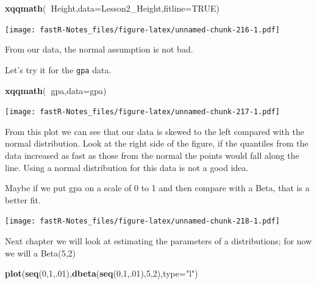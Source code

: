 \documentclass[]{book}
\newenvironment{Shaded}{\begin{snugshade}}{\end{snugshade}}
\newcommand{\KeywordTok}[1]{\textcolor[rgb]{0.13,0.29,0.53}{\textbf{#1}}}
\newcommand{\DataTypeTok}[1]{\textcolor[rgb]{0.13,0.29,0.53}{#1}}
\newcommand{\DecValTok}[1]{\textcolor[rgb]{0.00,0.00,0.81}{#1}}
\newcommand{\StringTok}[1]{\textcolor[rgb]{0.31,0.60,0.02}{#1}}
\newcommand{\OtherTok}[1]{\textcolor[rgb]{0.56,0.35,0.01}{#1}}
\newcommand{\OperatorTok}[1]{\textcolor[rgb]{0.81,0.36,0.00}{\textbf{#1}}}
\newcommand{\NormalTok}[1]{#1}
\theoremstyle{definition}
\theoremstyle{definition}
\theoremstyle{definition}
\theoremstyle{remark}
\begin{document}
\begin{Shaded}
\begin{Highlighting}[]
\KeywordTok{xqqmath}\NormalTok{(}\OperatorTok{~}\NormalTok{Height,}\DataTypeTok{data=}\NormalTok{Lesson2_Height,}\DataTypeTok{fitline=}\OtherTok{TRUE}\NormalTok{)}
\end{Highlighting}
\end{Shaded}

\texttt{[image: fastR-Notes\_files/figure-latex/unnamed-chunk-216-1.pdf]}

From our data, the normal assumption is not bad.

Let's try it for the \texttt{gpa} data.

\begin{Shaded}
\begin{Highlighting}[]
\KeywordTok{xqqmath}\NormalTok{(}\OperatorTok{~}\NormalTok{gpa,}\DataTypeTok{data=}\NormalTok{gpa)}
\end{Highlighting}
\end{Shaded}

\texttt{[image: fastR-Notes\_files/figure-latex/unnamed-chunk-217-1.pdf]}

From this plot we can see that our data is skewed to the left compared
with the normal distribution. Look at the right side of the figure, if
the quantiles from the data increased as fast as those from the normal
the points would fall along the line. Using a normal distribution for
this data is not a good idea.

Maybe if we put gpa on a scale of 0 to 1 and then compare with a Beta,
that is a better fit.

\begin{Shaded}
\end{Shaded}

\texttt{[image: fastR-Notes\_files/figure-latex/unnamed-chunk-218-1.pdf]}

Next chapter we will look at estimating the parameters of a
distributions; for now we will a Beta(5,2)

\begin{Shaded}
\begin{Highlighting}[]
\KeywordTok{plot}\NormalTok{(}\KeywordTok{seq}\NormalTok{(}\DecValTok{0}\NormalTok{,}\DecValTok{1}\NormalTok{,.}\DecValTok{01}\NormalTok{),}\KeywordTok{dbeta}\NormalTok{(}\KeywordTok{seq}\NormalTok{(}\DecValTok{0}\NormalTok{,}\DecValTok{1}\NormalTok{,.}\DecValTok{01}\NormalTok{),}\DecValTok{5}\NormalTok{,}\DecValTok{2}\NormalTok{),}\DataTypeTok{type=}\StringTok{"l"}\NormalTok{)}
\end{Highlighting}
\end{Shaded}
\end{document}
